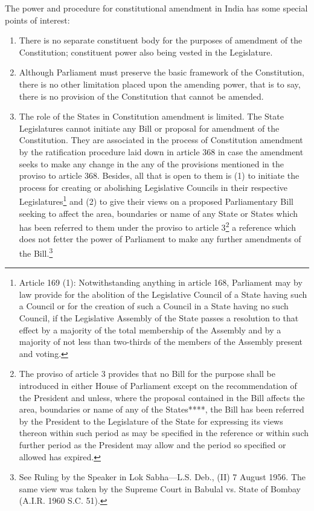 \begin{multicols}{2}
\vspace{-.1cm}

\noi
The power and procedure for constitutional amendment in India has some special points of
interest:

\vspace{-.2cm}

\begin{enumerate}
\itemsep=0pt
\item There is no separate constituent body for the purposes of amendment of the Constitution;
constituent power also being vested in the Legislature.

\item Although Parliament must preserve the basic framework of the Constitution, there is no
other limitation placed upon the amending power, that is to say, there is no provision of the
Constitution that cannot be amended.

\item The role of the States in Constitution amendment is limited. The State Legislatures cannot
initiate any Bill or proposal for amendment of the Constitution. They are associated in the
process of Constitution amendment by the ratification procedure laid down in article 368 in
case the amendment seeks to make any change in the any of the provisions mentioned in the
proviso to article 368. Besides, all that is open to them is (1) to initiate the process for creating
or abolishing Legislative Councils in their respective Legislatures\footnote{Article 169 (1): Notwithstanding anything in article 168, Parliament may by law provide for the abolition of the Legislative Council of a State having such a Council or for the creation of such a Council in a State having no such Council, if the Legislative Assembly of the State passes a resolution to that effect by a majority of the total membership of the Assembly and by a majority of not less than two-thirds of the members of the Assembly present and voting.} and (2) to give their views
on a proposed Parliamentary Bill seeking to affect the area, boundaries or name of any State
or States which has been referred to them under the proviso to article 3\footnote{The proviso of article 3 provides that no Bill for the purpose shall be introduced in either House of Parliament
except on the recommendation of the President and unless, where the proposal contained in the Bill affects the
area, boundaries or name of any of the States****, the Bill has been referred by the President to the Legislature
of the State for expressing its views thereon within such period as may be specified in the reference or within such
further period as the President may allow and the period so specified or allowed has expired.} a reference which
does not fetter the power of Parliament to make any further amendments of the Bill.\footnote{See Ruling by the Speaker in Lok Sabha—L.S. Deb., (II) 7 August 1956. The same view was taken by the Supreme Court in Babulal vs. State of Bombay (A.I.R. 1960 S.C. 51).}
\end{enumerate}


\end{multicols}
